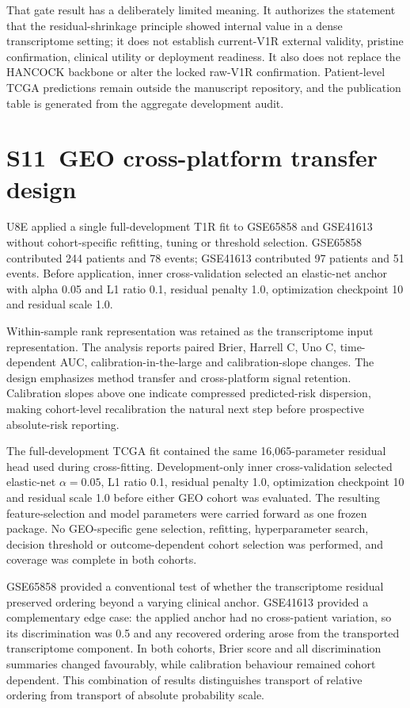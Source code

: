 That gate result has a deliberately limited meaning. It authorizes the statement that the residual-shrinkage principle showed internal value in a dense transcriptome setting; it does not establish current-V1R external validity, pristine confirmation, clinical utility or deployment readiness. It also does not replace the HANCOCK backbone or alter the locked raw-V1R confirmation. Patient-level TCGA predictions remain outside the manuscript repository, and the publication table is generated from the aggregate development audit.

\section*{S11~GEO cross-platform transfer design}
U8E applied a single full-development T1R fit to GSE65858 and GSE41613 without cohort-specific refitting, tuning or threshold selection. GSE65858 contributed 244 patients and 78 events; GSE41613 contributed 97 patients and 51 events. Before application, inner cross-validation selected an elastic-net anchor with alpha 0.05 and L1 ratio 0.1, residual penalty 1.0, optimization checkpoint 10 and residual scale 1.0.

Within-sample rank representation was retained as the transcriptome input representation. The analysis reports paired Brier, Harrell C, Uno C, time-dependent AUC, calibration-in-the-large and calibration-slope changes. The design emphasizes method transfer and cross-platform signal retention. Calibration slopes above one indicate compressed predicted-risk dispersion, making cohort-level recalibration the natural next step before prospective absolute-risk reporting.

The full-development TCGA fit contained the same 16,065-parameter residual head used during cross-fitting. Development-only inner cross-validation selected elastic-net $\alpha=0.05$, L1 ratio 0.1, residual penalty 1.0, optimization checkpoint 10 and residual scale 1.0 before either GEO cohort was evaluated. The resulting feature-selection and model parameters were carried forward as one frozen package. No GEO-specific gene selection, refitting, hyperparameter search, decision threshold or outcome-dependent cohort selection was performed, and coverage was complete in both cohorts.

GSE65858 provided a conventional test of whether the transcriptome residual preserved ordering beyond a varying clinical anchor. GSE41613 provided a complementary edge case: the applied anchor had no cross-patient variation, so its discrimination was 0.5 and any recovered ordering arose from the transported transcriptome component. In both cohorts, Brier score and all discrimination summaries changed favourably, while calibration behaviour remained cohort dependent. This combination of results distinguishes transport of relative ordering from transport of absolute probability scale.

